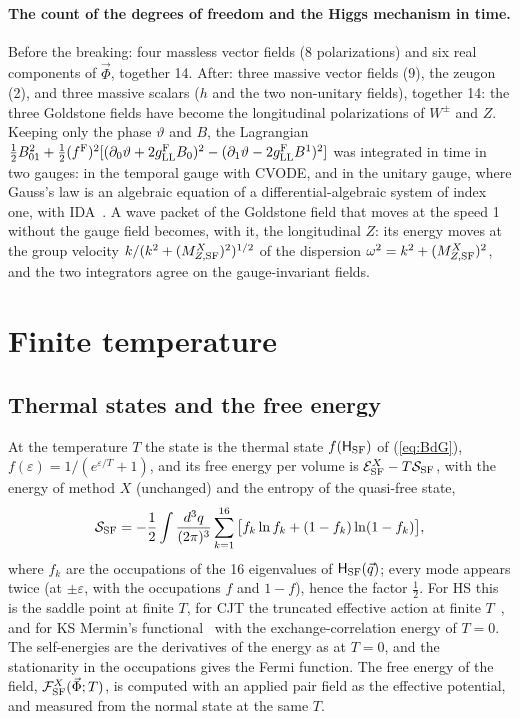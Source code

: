 \documentclass[aps,prd,onecolumn,superscriptaddress,nofootinbib,floatfix,longbibliography]{revtex4-2}
\newcommand{\LL}{{\rm LL}}
\newcommand{\SF}{{\rm SF}}
\begin{document}
\paragraph*{The count of the degrees of freedom and the Higgs mechanism in time.}
Before the breaking: four massless vector fields (8 polarizations) and six real components of $\vec\Phi$, together 14. After:
three massive vector fields (9), the zeugon (2), and three massive scalars ($h$ and the two non-unitary fields), together 14: the
three Goldstone fields have become the longitudinal polarizations of $W^\pm$ and $Z$. Keeping only the phase $\vartheta$ and $B$,
the Lagrangian $\frac12B_{01}^2+\frac12(f^{\rm F})^2[(\partial_0\vartheta+2g^{\rm F}_\LL B_0)^2-(\partial_1\vartheta-2g^{\rm F}_\LL B^1)^2]$ was integrated
in time in two gauges: in the temporal gauge with CVODE, and in the unitary gauge, where Gauss's law is an algebraic equation of
a differential-algebraic system of index one, with IDA~\cite{SUNDIALS2005,SUNDIALS2022}. A wave packet of the Goldstone field
that moves at the speed 1 without the gauge field becomes, with it, the longitudinal $Z$: its energy moves at the group velocity
$k/(k^2+(M^X_{Z,\SF})^2)^{1/2}$ of the dispersion $\omega^2=k^2+(M^X_{Z,\SF})^2$, and the two integrators agree on the gauge-invariant fields.

\section{Finite temperature}
\label{sec:thermal}

\subsection{Thermal states and the free energy}

At the temperature $T$ the state is the thermal state $f(\mathsf H_\SF)$ of (\ref{eq:BdG}), $f(\varepsilon)=1/(e^{\varepsilon/T}+1)$, and its
free energy per volume is $\mathcal E^X_\SF-T\mathcal S_\SF$, with the energy of method $X$ (unchanged) and the entropy of the
quasi-free state,
\begin{equation}
\mathcal S_\SF=-\frac12\int\frac{d^3q}{(2\pi)^3}\sum_{k=1}^{16}\big[f_k\ln f_k+(1-f_k)\ln(1-f_k)\big],
\label{eq:entropy}
\end{equation}
where $f_k$ are the occupations of the 16 eigenvalues of $\mathsf H_\SF(\vec q)$; every mode appears twice (at $\pm\varepsilon$, with the
occupations $f$ and $1-f$), hence the factor $\frac12$. For HS this is the saddle point at finite $T$, for CJT the truncated effective
action at finite $T$~\cite{AmelinoCamelia1993}, and for KS Mermin's functional~\cite{Mermin1965} with the exchange-correlation
energy of $T=0$. The self-energies are the derivatives of the energy as at $T=0$, and the stationarity in the occupations gives
the Fermi function. The free energy of the field, $\mathcal F^X_\SF(\vec\Phi;T)$, is computed with an applied pair field as the
effective potential, and measured from the normal state at the same $T$.
\end{document}
